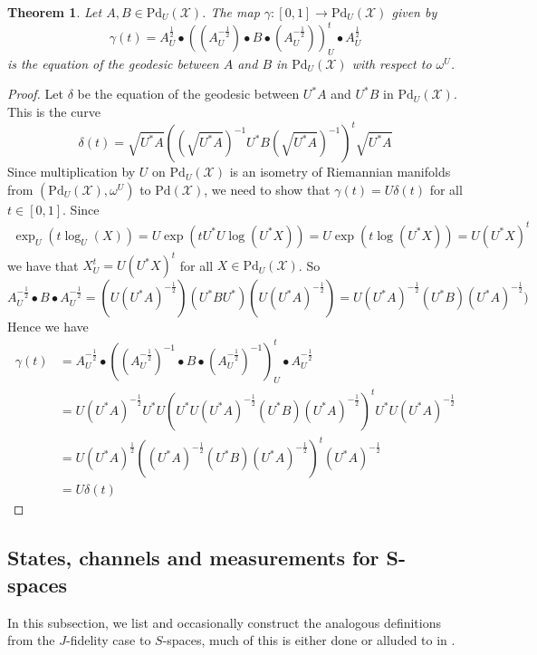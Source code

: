 \documentclass{amsart}
\numberwithin{equation}{section}
\newtheorem{theorem}{Theorem}[section]
\theoremstyle{definition}
\theoremstyle{plain}
\theoremstyle{solutionstyle}
\begin{document}
\begin{theorem}
    Let $A,B\in \mathrm{Pd}_U(\mathcal{X})$. The map $\gamma:[0,1]\to \mathrm{Pd}_U(\mathcal{X})$ given by 
    \begin{equation*}\gamma(t)=A_U^{\frac{1}{2}}\bullet ((A_U^{-\frac{1}{2}})\bullet B\bullet (A_U^{-\frac{1}{2}}))_U^t\bullet A_U^{\frac{1}{2}}\end{equation*} is the equation of the geodesic between $A$ and $B$ in $\mathrm{Pd}_U(\mathcal{X})$ with respect to $\omega^U$. 
\end{theorem}
\begin{proof}
    Let $\delta$ be the equation of the geodesic between $U^*A$ and $U^*B$ in $\mathrm{Pd}_{U}(\mathcal{X})$. This is the curve 
    \begin{equation*}\delta(t)=\sqrt{U^*A}((\sqrt{U^*A})^{-1}U^*B(\sqrt{U^*A})^{-1})^t\sqrt{U^*A}\end{equation*}
    Since multiplication by $U$ on $\mathrm{Pd}_{U}(\mathcal{X})$ is an isometry of Riemannian manifolds from $(\mathrm{Pd}_{U}(\mathcal{X}),\omega^U)$ to $\mathrm{Pd}(\mathcal{X})$, we need to show that $\gamma(t)=U\delta(t)$ for all $t\in [0,1]$. Since 
    \begin{align*}
        \exp_U(t\log_U(X))=U\exp(tU^*U\log(U^*X))=U\exp(t\log(U^*X))=U(U^*X)^t
    \end{align*}
    we have that $X_U^t=U(U^*X)^t$ for all $X\in \mathrm{Pd}_U(\mathcal{X})$. So
    \begin{equation*}{A_U^{-\frac{1}{2}}}\bullet B\bullet {A_U^{-\frac{1}{2}}}=(U(U^*A)^{-\frac{1}{2}})(U^*BU^*)(U(U^*A)^{-\frac{1}{2}})=U(U^*A)^{-\frac{1}{2}}(U^*B)(U^*A)^{-\frac{1}{2}})\end{equation*}
    Hence we have 
    \begin{align*}
        \gamma(t)&=A_U^{-\frac{1}{2}}\bullet ((A_U^{-\frac{1}{2}})^{-1}\bullet B\bullet (A_U^{-\frac{1}{2}})^{-1})_U^t\bullet A_U^{-\frac{1}{2}}\\
        &=U(U^*A)^{-\frac{1}{2}}U^*U(U^*U(U^*A)^{-\frac{1}{2}}(U^*B)(U^*A)^{-\frac{1}{2}})^{t}U^*U(U^*A)^{-\frac{1}{2}}\\
        &=U(U^*A)^{\frac{1}{2}}((U^*A)^{-\frac{1}{2}}(U^*B)(U^*A)^{-\frac{1}{2}})^{t}(U^*A)^{-\frac{1}{2}}\\
        &=U\delta(t)
    \end{align*}
\end{proof}




\subsection{States, channels and measurements for S-spaces}
In this subsection, we list and occasionally construct the analogous definitions from the $J$-fidelity case to $S$-spaces, much of this is either done or alluded to in \cite{bag2024quantumuchannelssspaces}.
\end{document}
